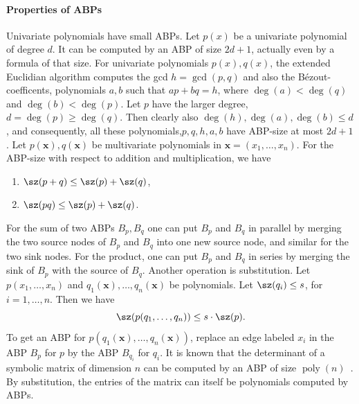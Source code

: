 \paragraph{Properties of ABPs}
Univariate polynomials have small ABPs. Let $p(x)$ be a univariate polynomial of degree $d$. It can be computed by an ABP of size $2d+1$, actually even by a formula of that size.
For univariate polynomials $p(x),q(x)$, the extended Euclidian algorithm computes the gcd $h=\gcd(p,q)$ and also the B\'ezout-coefficents, polynomials $a,b$ such that $ap+bq=h$, where $\deg(a)<\deg(q)$ and $\deg(b)<\deg(p)$. Let $p$ have the larger degree, $d=\deg(p)\geq\deg(q)$. Then clearly also $\deg(h),\deg(a),\deg(b)\leq d$, and consequently, all these polynomials,$p,q,h,a,b$ have ABP-size at most $2d+1$.
Let $p(\mathbf x),q(\mathbf x)$ be multivariate polynomials in $\mathbf x=(x_1,\ldots,x_n)$. For the ABP-size with respect to addition and multiplication, we have
\begin{enumerate}\item $\sz(p+q)\leq\sz(p)+\sz(q)$,\item $\sz(pq)\leq\sz(p)+\sz(q)$.\end{enumerate}
For the sum of two ABPs $B_p,B_q$ one can put $B_p$ and $B_q$ in parallel by merging the two source nodes of $B_p$ and $B_q$ into one new source node, and similar for the two sink nodes. For the product, one can put $B_p$ and $B_q$ in series by merging the sink of $B_p$ with the source of $B_q$.
Another operation is substitution. Let $p(x_1,\ldots,x_n)$ and $q_1(\mathbf x),\ldots,q_n(\mathbf x)$ be polynomials. Let $\sz(q_i)\leq s$, for $i=1,\ldots,n$. Then we have
\[\sz(p(q_1,\ldots,q_n))\leq s\cdot\sz(p).\]
To get an ABP for $p(q_1(\mathbf x),\ldots,q_n(\mathbf x))$, replace an edge labeled $x_i$ in the ABP $B_p$ for $p$ by the ABP $B_{q_i}$ for $q_i$.
It is known that the determinant of a symbolic matrix of dimension $n$ can be computed by an ABP of size $\operatorname{poly}(n)$~\cite{ref15}. By substitution, the entries of the matrix can itself be polynomials computed by ABPs.
